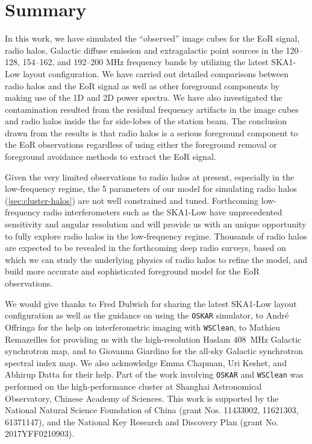 \documentclass[modern]{aastex62}
\begin{document}
\section{Summary}
\label{sec:summary}

{\color{cyan}%
In this work, we have simulated the \enquote{observed} image cubes for
the EoR signal, radio halos, Galactic diffuse emission and extragalactic
point sources in the \numrange{120}{128}, \numrange{154}{162}, and
\numrange{192}{200} \si{\MHz} frequency bands by utilizing the latest
SKA1-Low layout configuration.
We have carried out detailed comparisons between radio halos and the
EoR signal as well as other foreground components by making use of the
1D and 2D power spectra.
We have also investigated the contamination resulted from the residual
frequency artifacts in the image cubes and radio halos inside the far
side-lobes of the station beam.
The conclusion drawn from the results is that radio halos is a serious
foreground component to the EoR observations regardless of using either
the foreground removal or foreground avoidance methods to extract the EoR
signal.

Given the very limited observations to radio halos at present,
especially in the low-frequency regime, the 5 parameters of our model
for simulating radio halos (\autoref{sec:cluster-halos}) are not well
constrained and tuned.
Forthcoming low-frequency radio interferometers such as the SKA1-Low
have unprecedented sensitivity and angular resolution and will provide
us with an unique opportunity to fully explore radio halos in the
low-frequency regime.
Thousands of radio halos are expected to be revealed in the forthcoming
deep radio surveys, based on which we can study the underlying physics
of radio halos to refine the model, and build more accurate and
sophisticated foreground model for the EoR observations.
} %


\acknowledgments

We would give thanks
to Fred Dulwich for sharing the latest SKA1-Low layout configuration as
well as the guidance on using the \texttt{OSKAR} simulator,
to Andr\'e Offringa for the help on interferometric imaging with
\texttt{WSClean},
to Mathieu Remazeilles for providing us with the high-resolution Haslam
\SI{408}{\MHz} Galactic synchrotron map,
and to Giovanna Giardino for the all-sky Galactic synchrotron spectral
index map.
We also acknowledge Emma Chapman, Uri Keshet, and Abhirup Datta for
their help.
Part of the work involving \texttt{OSKAR} and \texttt{WSClean} was
performed on the high-performance cluster at Shanghai Astronomical
Observatory, Chinese Academy of Sciences.
This work is supported by the National Natural Science Foundation of China
(grant Nos. 11433002, 11621303, 61371147),
and the National Key Research and Discovery Plan (grant No. 2017YFF0210903).
\end{document}
